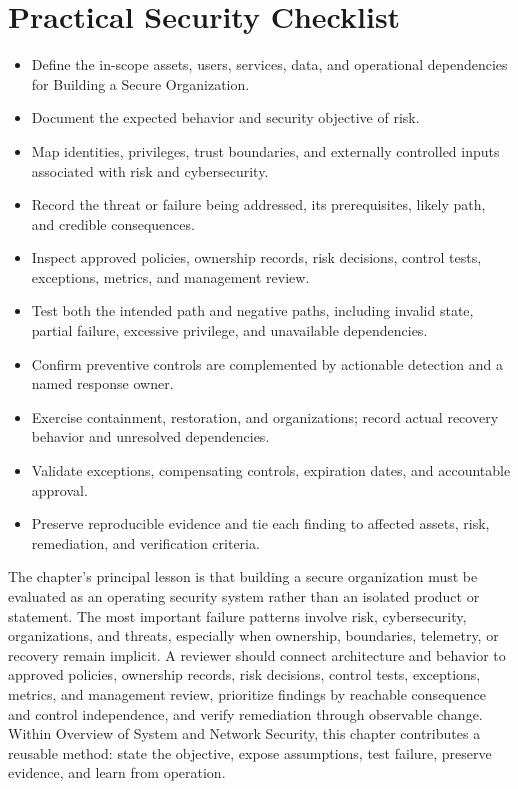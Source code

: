 \documentclass[11pt]{article}
\begin{document}
\section*{Practical Security Checklist}
\begin{itemize}[label=$\square$]
\item Define the in-scope assets, users, services, data, and operational dependencies for Building a Secure Organization.
\item Document the expected behavior and security objective of risk.
\item Map identities, privileges, trust boundaries, and externally controlled inputs associated with risk and cybersecurity.
\item Record the threat or failure being addressed, its prerequisites, likely path, and credible consequences.
\item Inspect approved policies, ownership records, risk decisions, control tests, exceptions, metrics, and management review.
\item Test both the intended path and negative paths, including invalid state, partial failure, excessive privilege, and unavailable dependencies.
\item Confirm preventive controls are complemented by actionable detection and a named response owner.
\item Exercise containment, restoration, and organizations; record actual recovery behavior and unresolved dependencies.
\item Validate exceptions, compensating controls, expiration dates, and accountable approval.
\item Preserve reproducible evidence and tie each finding to affected assets, risk, remediation, and verification criteria.
\end{itemize}
\begin{synthesisbox}
The chapter's principal lesson is that building a secure organization must be evaluated as an operating security system rather than an isolated product or statement. The most important failure patterns involve risk, cybersecurity, organizations, and threats, especially when ownership, boundaries, telemetry, or recovery remain implicit. A reviewer should connect architecture and behavior to approved policies, ownership records, risk decisions, control tests, exceptions, metrics, and management review, prioritize findings by reachable consequence and control independence, and verify remediation through observable change. Within Overview of System and Network Security, this chapter contributes a reusable method: state the objective, expose assumptions, test failure, preserve evidence, and learn from operation.
\end{synthesisbox}
\end{document}

